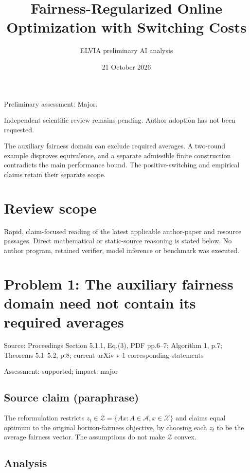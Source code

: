 \documentclass[11pt]{article}
\begin{document}
\title{Fairness-Regularized Online Optimization with Switching Costs}

\author{ELVIA preliminary AI analysis}\date{21 October 2026}\maketitle

Preliminary assessment: Major.\par

Independent scientific review remains pending. Author adoption has not been requested.

The auxiliary fairness domain can exclude required averages. A two-round example disproves equivalence, and a separate admissible finite construction contradicts the main performance bound. The positive-switching and empirical claims retain their separate scope.

\section*{Review scope}

Rapid, claim-focused reading of the latest applicable author-paper and resource passages. Direct mathematical or static-source reasoning is stated below. No author program, retained verifier, model inference or benchmark was executed.

\section*{Problem 1: The auxiliary fairness domain need not contain its required averages}

Source: Proceedings Section 5.1.1, Eq.(3), PDF pp.6–7; Algorithm 1, p.7; Theorems 5.1–5.2, p.8; current arXiv v 1 corresponding statements

Assessment: supported; impact: major

\subsection*{Source claim (paraphrase)}

The reformulation restricts \(z_t\in\mathcal Z=\{Ax:A\in\mathcal A,x\in\mathcal X\}\) and claims equal optimum to the original horizon-fairness objective, by choosing each \(z_t\) to be the average fairness vector. The assumptions do not make \(\mathcal Z\) convex.

\subsection*{Analysis}
\end{document}
